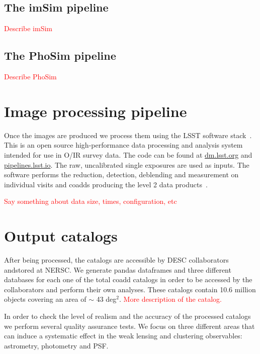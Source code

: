 \documentclass[\docopts]{\docclass}
\begin{document}
\subsection{The imSim pipeline}
\label{sec:imsim_pipeline}

\textcolor{red}{Describe imSim}

\subsection{The PhoSim pipeline}
\label{sec:phosim_pipeline}

\textcolor{red}{Describe PhoSim}

\section{Image processing pipeline}
\label{sec:image_processing_pipeline}

Once the images are produced we process them using the LSST software stack~\citep{2015arXiv151207914J}. This is an open
source high-performance data processing and analysis system intended for use in O/IR survey data. The code can be found at
\url{dm.lsst.org} and \url{pipelines.lsst.io}. The raw, uncalibrated single exposures are used as inputs. The software performs
the reduction, detection, deblending and measurement on individual visits and coadds producing the level 2 data
products~\citep{2015arXiv151207914J}.

\textcolor{red}{Say something about data size, times, configuration, etc}

\section{Output catalogs}
\label{sec:catalogs}

After being processed, the catalogs are accessible by DESC collaborators andstored at NERSC. We generate pandas
dataframes and three different databases for each one of the total coadd catalogs in order to be accessed by the
collaborators and perform their own analyses. These catalogs contain 10.6 million objects covering an area
of $\sim$ 43 deg$^{2}$. \textcolor{red}{More description of the catalog.}

In order to check the level of realism and the accuracy of the processed catalogs we perform several quality assurance tests.
We focus on three different areas that can induce a systematic effect in the weak lensing and clustering observables:
astrometry, photometry and PSF.
\end{document}
